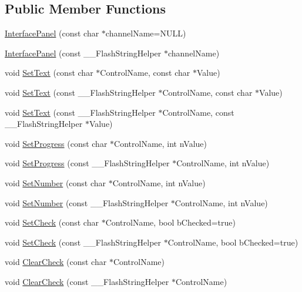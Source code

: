 \subsection*{Public Member Functions}
\begin{DoxyCompactItemize}
\item 
\hyperlink{class_interface_panel_ac7d304958b61155401f0ebbc2fc427a7}{Interface\-Panel} (const char $\ast$channel\-Name=N\-U\-L\-L)
\item 
\hyperlink{class_interface_panel_a4a7e5b5fa82501da446edff5e8a91f4b}{Interface\-Panel} (const \-\_\-\-\_\-\-Flash\-String\-Helper $\ast$channel\-Name)
\item 
void \hyperlink{class_interface_panel_a3bac571aa848d37e1fd23d9551ceacf9}{Set\-Text} (const char $\ast$Control\-Name, const char $\ast$Value)
\item 
void \hyperlink{class_interface_panel_acd10e08c8c9c4e01d622b9d6ed820ca2}{Set\-Text} (const \-\_\-\-\_\-\-Flash\-String\-Helper $\ast$Control\-Name, const char $\ast$Value)
\item 
void \hyperlink{class_interface_panel_accfbc36dbac07f787057207243733284}{Set\-Text} (const \-\_\-\-\_\-\-Flash\-String\-Helper $\ast$Control\-Name, const \-\_\-\-\_\-\-Flash\-String\-Helper $\ast$Value)
\item 
void \hyperlink{class_interface_panel_a8c318680d9a47f4362ce9f24c5cd883d}{Set\-Progress} (const char $\ast$Control\-Name, int n\-Value)
\item 
void \hyperlink{class_interface_panel_a47f11df228897dccb36e50258054d104}{Set\-Progress} (const \-\_\-\-\_\-\-Flash\-String\-Helper $\ast$Control\-Name, int n\-Value)
\item 
void \hyperlink{class_interface_panel_adccffdc7239c79e8afd8cf9be768fdef}{Set\-Number} (const char $\ast$Control\-Name, int n\-Value)
\item 
void \hyperlink{class_interface_panel_a4973b1694aa8ab390d3199ba28939491}{Set\-Number} (const \-\_\-\-\_\-\-Flash\-String\-Helper $\ast$Control\-Name, int n\-Value)
\item 
void \hyperlink{class_interface_panel_a4cc8cf346c34a2713253c96d295361d3}{Set\-Check} (const char $\ast$Control\-Name, bool b\-Checked=true)
\item 
void \hyperlink{class_interface_panel_aff2ae872c64b2271e60d245b2a910962}{Set\-Check} (const \-\_\-\-\_\-\-Flash\-String\-Helper $\ast$Control\-Name, bool b\-Checked=true)
\item 
void \hyperlink{class_interface_panel_a6dc489a049643e7c8eb93122a8bb7917}{Clear\-Check} (const char $\ast$Control\-Name)
\item 
void \hyperlink{class_interface_panel_a7908e97410a75e652cb2d860ad99dfe1}{Clear\-Check} (const \-\_\-\-\_\-\-Flash\-String\-Helper $\ast$Control\-Name)
\end{DoxyCompactItemize}
